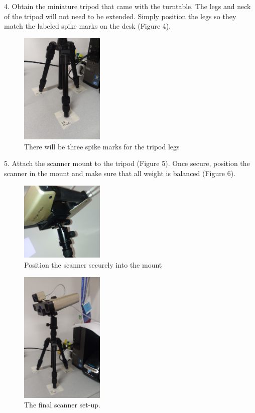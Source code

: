 \newpage

4. Obtain the miniature tripod that came with the turntable. The legs and neck of the tripod will not need to be extended. Simply position the legs so they match the labeled spike marks on the desk (Figure 4). 

\begin{figure}[!htp]
\centering
\includegraphics[width=4cm]{Spike_Tripod}
\caption{There will be three spike marks for the tripod legs}
\label{Image 4}
\end{figure}

5. Attach the scanner mount to the tripod (Figure 5). Once secure, position the scanner in the mount and make sure that all weight is balanced (Figure 6). 

\begin{figure}[!htp]
\centering
\includegraphics[width=4cm]{Clip}
\caption{Position the scanner securely into the mount}
\label{Image 5}
\end{figure}

\begin{figure}[!htp]
\centering
\includegraphics[width=4cm]{Full_Tripod}
\caption{The final scanner set-up.}
\label{Image 6}
\end{figure}

